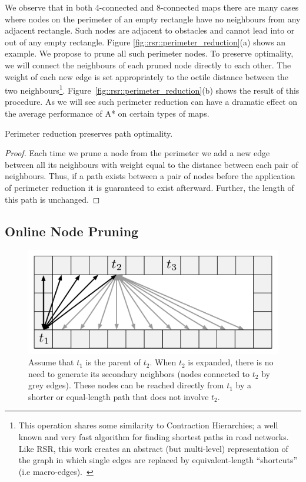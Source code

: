We observe that in both 4-connected and 8-connected maps there are many cases
where nodes on the perimeter of an empty rectangle have no neighbours from any
adjacent rectangle.  Such nodes are adjacent to obstacles and cannot lead into
or out of any empty rectangle.  Figure \ref{fig::rsr::perimeter_reduction}(a)
shows an example.  We propose to prune all such perimeter nodes. To preserve
optimality, we will connect the neighbours of each pruned node directly to
each other.  The weight of each new edge is set appropriately to the octile
distance between the two neighbours\footnote{This operation shares some similarity
to Contraction Hierarchies; a well known and very fast algorithm for finding
shortest paths in road networks. Like RSR, this work creates an abstract
(but multi-level) representation of the graph in which single edges are replaced 
by equivalent-length ``shortcuts'' (i.e macro-edges).~\cite{geisberger08}}.
Figure~\ref{fig::rsr::perimeter_reduction}(b) shows the result of this
procedure.  As we will see such perimeter reduction can have a dramatic effect
on the average performance of A* on certain types of maps.
\begin{lemma}
Perimeter reduction preserves path optimality.
\end{lemma}
\begin{proof}
Each time we prune a node from the perimeter we add a new edge between
all its neighbours with weight equal to the distance between each pair
of neighbours.  Thus, if a path exists between a pair of nodes before the
application of perimeter reduction it is guaranteed to exist afterward.
Further, the length of this path is unchanged.
\end{proof}

\subsection{Online Node Pruning}
\label{cha::rsr::online_pruning}

\begin{figure}[bt]
	\begin{center}
	\includegraphics[width=0.5\columnwidth, trim = 10mm 10mm 10mm 0mm]
	{chapter_rsr/diagrams/online_pruning.pdf}
	\end{center}
	\vspace{-3pt}
	\caption[RSR enhancement: online pruning]
    {\small
	Assume that $t_{1}$ is the parent of $t_2$. When $t_2$
	is expanded, there is no need to generate its secondary neighbors
	(nodes connected to $t_2$ by grey edges). These nodes can be reached directly 
	from $t_1$ by a shorter or equal-length path that does not involve $t_2$.
}
\label{fig::rsr::online_pruning}
\end{figure}

